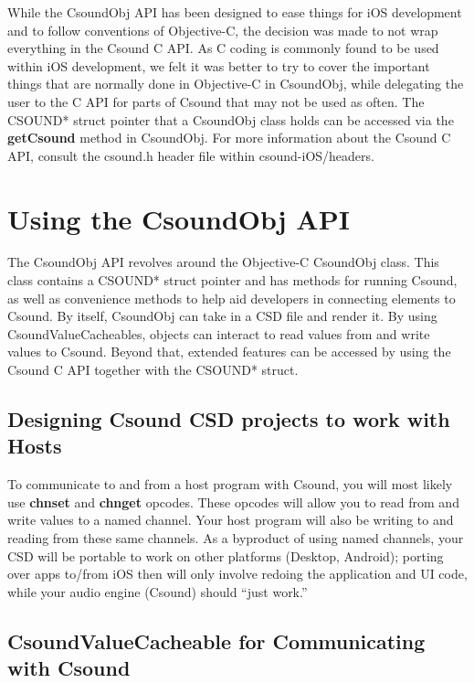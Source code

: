 \documentclass[11pt]{article}
\begin{document}
While the CsoundObj API has been designed to ease things for iOS development and to follow conventions of Objective-C, the decision was made to not wrap everything in the Csound C API.  As C coding is commonly found to be used within iOS development, we felt it was better to try to cover the important things that are normally done in Objective-C in CsoundObj, while delegating the user to the C API for parts of Csound that may not be used as often.  The CSOUND* struct pointer that a CsoundObj class holds can be accessed via the \textbf{getCsound} method in CsoundObj.  For more information about the Csound C API, consult the csound.h header file within csound-iOS/headers.

\section{Using the CsoundObj API}

The CsoundObj API revolves around the Objective-C CsoundObj class. This class contains a CSOUND* struct pointer and has methods for running Csound, as well as convenience methods to help aid developers in connecting elements to Csound. By itself, CsoundObj can take in a CSD file and render it.  By using CsoundValueCacheables, objects can interact to read values from and write values to Csound.  Beyond that, extended features can be accessed by using the Csound C API together with the CSOUND* struct.

\subsection{Designing Csound CSD projects to work with Hosts}

To communicate to and from a host program with Csound, you will most likely use \textbf{chnset} and \textbf{chnget} opcodes. These opcodes will allow you to read from and write values to a named channel.  Your host program will also be writing to and reading from these same channels.  As a byproduct of using named channels, your CSD will be portable to work on other platforms (Desktop, Android); porting over apps to/from iOS then will only involve redoing the application and UI code, while your audio engine (Csound) should ``just work.'' 

 

\subsection{CsoundValueCacheable for Communicating with Csound}
\end{document}
